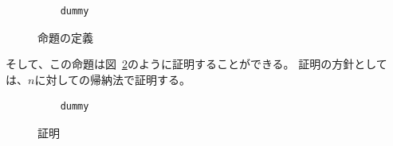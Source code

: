 \begin{figure}[tp]
  \begin{lstlisting}
    dummy
  \end{lstlisting}
  \label{code:overview:fact-spec}
  \caption{命題の定義}
\end{figure}

そして、この命題は図~\ref{code:overview:fact-proof}のように証明することができる。
証明の方針としては、$n$に対しての帰納法で証明する。

\begin{figure}[tp]
  \begin{lstlisting}
    dummy
  \end{lstlisting}
  \label{code:overview:fact-proof}
  \caption{証明}
\end{figure}

